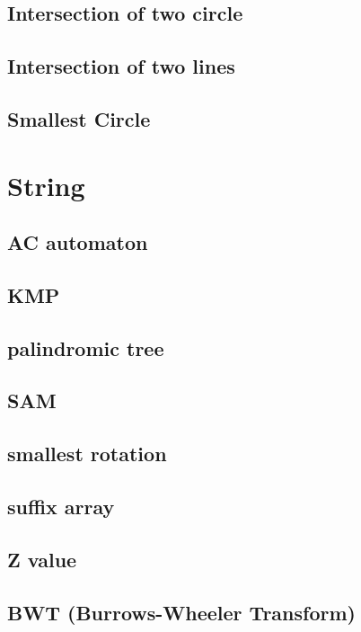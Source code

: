 	\subsection{Intersection of two circle}
		
	\subsection{Intersection of two lines}
		
	\subsection{Smallest Circle}
		

\section{String}
	\subsection{AC automaton}
		
	\subsection{KMP}
		
	\subsection{palindromic tree}
		
	\subsection{SAM}
		
	\subsection{smallest rotation }
		
	\subsection{suffix array}
		
	\subsection{Z value}
		
	\subsection{BWT (Burrows-Wheeler Transform)}
		

